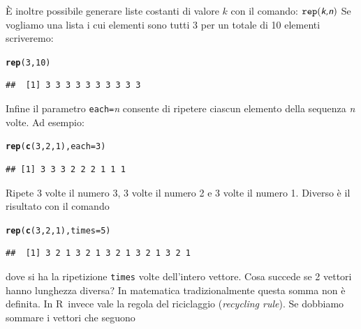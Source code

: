 \documentclass[onecolumn,11pt]{book}\usepackage[]{graphicx}\usepackage[]{color}
\makeatletter
\newcommand{\hlnum}[1]{\textcolor[rgb]{0.686,0.059,0.569}{#1}}%
\newcommand{\hlstd}[1]{\textcolor[rgb]{0.345,0.345,0.345}{#1}}%
\newcommand{\hlkwc}[1]{\textcolor[rgb]{0.333,0.667,0.333}{#1}}%
\newcommand{\hlkwd}[1]{\textcolor[rgb]{0.737,0.353,0.396}{\textbf{#1}}}%
\newenvironment{kframe}{%
 \def\at@end@of@kframe{}%
 \ifinner\ifhmode%
  \def\at@end@of@kframe{\end{minipage}}%
  \begin{minipage}{\columnwidth}%
 \fi\fi%
 \def\FrameCommand##1{\hskip\@totalleftmargin \hskip-\fboxsep
 \colorbox{shadecolor}{##1}\hskip-\fboxsep
     \hskip-\linewidth \hskip-\@totalleftmargin \hskip\columnwidth}%
 \MakeFramed {\advance\hsize-\width
   \@totalleftmargin\z@ \linewidth\hsize
   \@setminipage}}%
 {\par\unskip\endMakeFramed%
 \at@end@of@kframe}
\newenvironment{knitrout}{}{} %
\newcommand{\varia}[1]{\textsl{\textsf{#1}}}
\newcommand{\rpr}{\textsf{R}~}
\makeatother
\begin{document}
\`E inoltre possibile generare liste costanti di valore $k$ con il comando:
$\texttt{rep} (\varia{k,n})$
Se vogliamo una lista i cui elementi sono tutti 3 per un totale di 10 elementi scriveremo:
\begin{knitrout}
\color{fgcolor}\begin{kframe}
\begin{alltt}
\hlkwd{rep}\hlstd{(}\hlnum{3}\hlstd{,}\hlnum{10}\hlstd{)}
\end{alltt}
\begin{verbatim}
##  [1] 3 3 3 3 3 3 3 3 3 3
\end{verbatim}
\end{kframe}
\end{knitrout}
Infine il parametro \texttt{each=}\varia{n} consente di ripetere ciascun elemento della sequenza \varia{n} volte. Ad esempio:
\begin{knitrout}
\color{fgcolor}\begin{kframe}
\begin{alltt}
\hlkwd{rep}\hlstd{(}\hlkwd{c}\hlstd{(}\hlnum{3}\hlstd{,}\hlnum{2}\hlstd{,}\hlnum{1}\hlstd{),}\hlkwc{each}\hlstd{=}\hlnum{3}\hlstd{)}
\end{alltt}
\begin{verbatim}
## [1] 3 3 3 2 2 2 1 1 1
\end{verbatim}
\end{kframe}
\end{knitrout}
Ripete 3 volte il numero 3, 3 volte il numero 2 e 3 volte il numero 1.
Diverso \`e il risultato con il comando
\begin{knitrout}
\color{fgcolor}\begin{kframe}
\begin{alltt}
\hlkwd{rep}\hlstd{(}\hlkwd{c}\hlstd{(}\hlnum{3}\hlstd{,}\hlnum{2}\hlstd{,}\hlnum{1}\hlstd{),}\hlkwc{times}\hlstd{=}\hlnum{5}\hlstd{)}
\end{alltt}
\begin{verbatim}
##  [1] 3 2 1 3 2 1 3 2 1 3 2 1 3 2 1
\end{verbatim}
\end{kframe}
\end{knitrout}
dove si ha la ripetizione \texttt{times} volte dell'intero vettore.
Cosa succede se 2 vettori hanno lunghezza diversa? In matematica tradizionalmente questa somma non \`e definita. In \rpr invece vale la regola del riciclaggio  (\textit{recycling rule}). Se dobbiamo sommare i vettori che seguono
\end{document}
